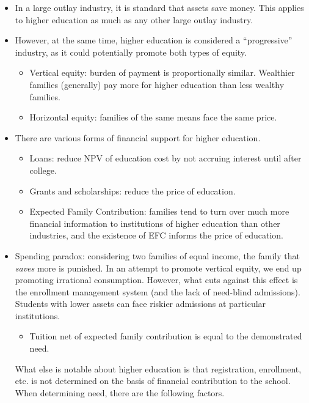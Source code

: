 \documentclass[10pt]{extarticle}
\begin{document}
\begin{itemize}
\begin{itemize}
      \end{itemize}
    \item In a large outlay industry, it is standard that assets save money. This applies to higher education as much as any other large outlay industry.
    \item However, at the same time, higher education is considered a ``progressive'' industry, as it could potentially promote both types of equity.
      \begin{itemize}
        \item Vertical equity: burden of payment is proportionally similar. Wealthier families (generally) pay more for higher education than less wealthy families.
        \item Horizontal equity: families of the same means face the same price.
      \end{itemize}
    \item There are various forms of financial support for higher education.
      \begin{itemize}
        \item Loans: reduce NPV of education cost by not accruing interest until after college.
        \item Grants and scholarships: reduce the price of education.
        \item Expected Family Contribution: families tend to turn over much more financial information to institutions of higher education than other industries, and the existence of EFC informs the price of education.
      \end{itemize}
    \item Spending paradox: considering two families of equal income, the family that \textit{saves} more is punished. In an attempt to promote vertical equity, we end up promoting irrational consumption. However, what cuts against this effect is the enrollment management system (and the lack of need-blind admissions). Students with lower assets can face riskier admissions at particular institutions.
      \begin{itemize}
        \item Tuition net of expected family contribution is equal to the demonstrated need.
      \end{itemize}
      What else is notable about higher education is that registration, enrollment, etc. is not determined on the basis of financial contribution to the school. When determining need, there are the following factors.
      \begin{itemize}

\end{itemize}
\end{itemize}
\end{document}

